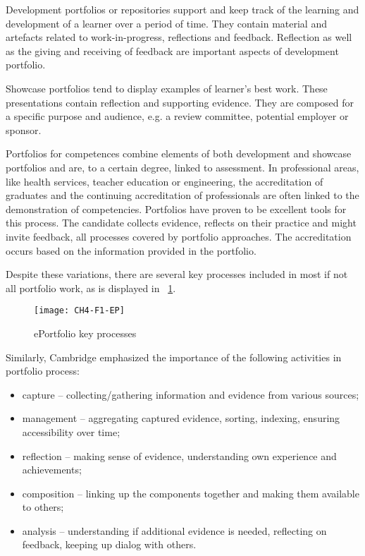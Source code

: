 Development portfolios or repositories support and keep track of the learning
and development of a learner over a period of time. They contain material and
artefacts related to work-in-progress, reflections and feedback. Reflection as
well as the giving and receiving of feedback are important aspects of
development portfolio.

Showcase portfolios tend to display examples of learner’s best work. These
presentations contain reflection and supporting evidence. They are composed for
a specific purpose and audience, e.g. a review committee, potential employer or
sponsor.

Portfolios for competences combine elements of both development and showcase
portfolios and are, to a certain degree, linked to assessment. In professional
areas, like health services, teacher education or engineering, the accreditation
of graduates and the continuing accreditation of professionals are often linked
to the demonstration of competencies. Portfolios have proven to be excellent
tools for this process. The candidate collects evidence, reflects on their
practice and might invite feedback, all processes covered by portfolio
approaches. The accreditation occurs based on the information provided in the portfolio.

Despite these variations, there are several key processes included in most if
not all portfolio work, as is displayed in ~\ref{fig:ep}.
 
\begin{figure}[htb]
\centering
\texttt{[image: CH4-F1-EP]}
\caption[ePortfolio key processes]{ePortfolio key processes \citep{Malloff2010}}
\label{fig:ep}
\end{figure}

Similarly, Cambridge \citeyearpar{Cambridge2010} emphasized the importance of
the following activities in portfolio process:

\begin{itemize}
  \item capture -- collecting/gathering information and evidence from various
  sources;
  \item management -- aggregating captured evidence, sorting, indexing, ensuring
  accessibility over time;
  \item reflection -- making sense of evidence, understanding own experience and
  achievements;
  \item composition -- linking up the components together and making them
  available to others;
  \item analysis -- understanding if additional evidence is needed, reflecting
  on feedback, keeping up dialog with others.
\end{itemize}


